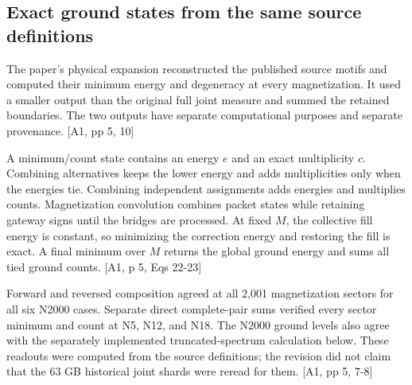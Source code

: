 \subsection{Exact ground states from the same source definitions}\label{exact-ground-states-from-the-same-source-definitions}

The paper's physical expansion reconstructed the published source motifs and computed their minimum energy and degeneracy at every magnetization. It used a smaller output than the original full joint measure and summed the retained boundaries. The two outputs have separate computational purposes and separate provenance. {[}A1, pp 5, 10{]}

A minimum/count state contains an energy \(e\) and an exact multiplicity \(c\). Combining alternatives keeps the lower energy and adds multiplicities only when the energies tie. Combining independent assignments adds energies and multiplies counts. Magnetization convolution combines packet states while retaining gateway signs until the bridges are processed. At fixed \(M\), the collective fill energy is constant, so minimizing the correction energy and restoring the fill is exact. A final minimum over \(M\) returns the global ground energy and sums all tied ground counts. {[}A1, p 5, Eqs 22-23{]}

Forward and reversed composition agreed at all 2,001 magnetization sectors for all six N2000 cases. Separate direct complete-pair sums verified every sector minimum and count at N5, N12, and N18. The N2000 ground levels also agree with the separately implemented truncated-spectrum calculation below. These readouts were computed from the source definitions; the revision did not claim that the 63 GB historical joint shards were reread for them. {[}A1, pp 5, 7-8{]}

